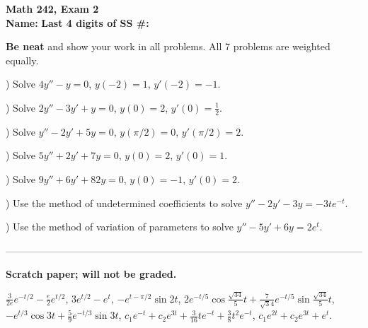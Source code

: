 \documentclass[12pt]{amsart}
\begin{document}
\noindent
{\bf Math 242, Exam 2}\\
{\bf  Name:} \hskip 3in {\bf Last 4 digits of SS \#:}

\noindent
{\bf Be neat} and show your work in all problems. All 7 problems are weighted
equally.

) Solve $4y''-y=0$, $y(-2)=1$, $y'(-2)=-1$.


) Solve $2y''-3y'+y=0$, $y(0)=2$, $y'(0)=\frac{1}{2}$.



) Solve $y''-2y'+5y=0$, $y(\pi /2)=0$, $y'(\pi /2)=2$.

) Solve $5y''+2y'+7y=0$, $y(0)=2$, $y'(0)=1$.

) Solve $9y''+6y'+82y=0$, $y(0)=-1$, $y'(0)=2$.


) Use the method of undetermined coefficients to solve $y''-2y'-3y=-3te^{-t}$.


) Use the method of variation of parameters to solve $y''-5y'+6y=2e^t$.

\vskip 4.5in


\noindent
------------------------------------------------------------------------------------------------------------

\noindent
{\bf Scratch paper; will not be graded.}

\noindent
$\frac{3}{2e}e^{-t/2}-\frac{e}{2}e^{t/2}$, $3e^{t/2}-e^t$, 
$-e^{t-\pi/2} \sin 2t$, 
$2e^{-t/5}\cos \frac{\sqrt{34}}{5}t + \frac{7}{\sqrt34}e^{-t/5} \sin \frac{\sqrt{34}}{5}t$,
$-e^{t/3} \cos 3t + \frac{5}{9} e^{-t/3} \sin 3t$, 
$c_1e^{-t}+c_2e^{3t}+ \frac{3}{16}te^{-t}+ \frac{3}{8}t^2e^{-t}$,
$c_1e^{2t}+c_2e^{3t}+e^t$.
\end{document}
